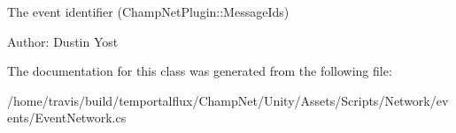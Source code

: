The event identifier (Champ\-Net\-Plugin\-::\-Message\-Ids) 

Author\-: Dustin Yost 

The documentation for this class was generated from the following file\-:\begin{DoxyCompactItemize}
\item 
/home/travis/build/temportalflux/\-Champ\-Net/\-Unity/\-Assets/\-Scripts/\-Network/events/Event\-Network.\-cs\end{DoxyCompactItemize}
